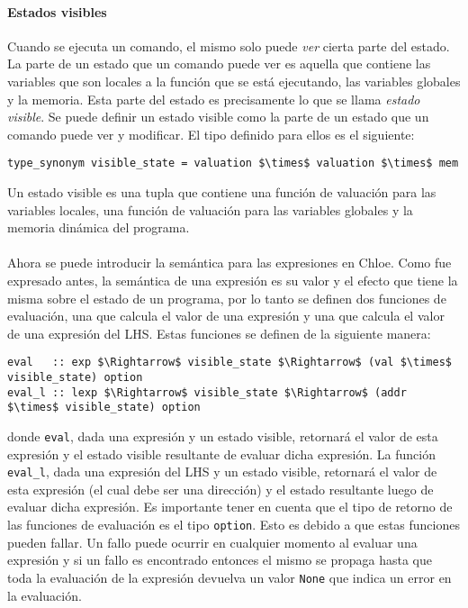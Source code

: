 \paragraph*{Estados visibles}\label{paragraph:visible_state}

Cuando se ejecuta un comando, el mismo solo puede \textit{ver} cierta parte del estado.
La parte de un estado que un comando puede ver es aquella que contiene las variables que son locales a la función que se está ejecutando, las variables globales y la memoria.
Esta parte del estado es precisamente lo que se llama \textit{estado visible}.
Se puede definir un estado visible como la parte de un estado que un comando puede ver y modificar.
El tipo definido para ellos es el siguiente:

\begin{lstlisting}[frame=single, mathescape=true]
type_synonym visible_state = valuation $\times$ valuation $\times$ mem
\end{lstlisting}

Un estado visible es una tupla que contiene una función de valuación para las variables locales, una función de valuación para las variables globales y la memoria dinámica del programa.

\paragraph*{}
Ahora se puede introducir la semántica para las expresiones en Chloe.
Como fue expresado antes, la semántica de una expresión es su valor y el efecto que tiene la misma sobre el estado de un programa, por lo tanto se definen dos funciones de evaluación, una que calcula el valor de una expresión y una que calcula el valor de una expresión del LHS.
Estas funciones se definen de la siguiente manera:

\begin{lstlisting}[frame=single, mathescape=true]
eval   :: exp $\Rightarrow$ visible_state $\Rightarrow$ (val $\times$ visible_state) option
eval_l :: lexp $\Rightarrow$ visible_state $\Rightarrow$ (addr $\times$ visible_state) option
\end{lstlisting}

donde \verb|eval|, dada una expresión y un estado visible, retornará el valor de esta expresión y el estado visible resultante de evaluar dicha expresión.
La función \verb|eval_l|, dada una expresión del LHS y un estado visible, retornará el valor de esta expresión (el cual debe ser una dirección) y el estado resultante luego de evaluar dicha expresión.
Es importante tener en cuenta que el tipo de retorno de las funciones de evaluación es el tipo \verb|option|.
Esto es debido a que estas funciones pueden fallar.
Un fallo puede ocurrir en cualquier momento al evaluar una expresión y si un fallo es encontrado entonces el mismo se propaga hasta que toda la evaluación de la expresión devuelva un valor \verb|None| que indica un error en la evaluación.

